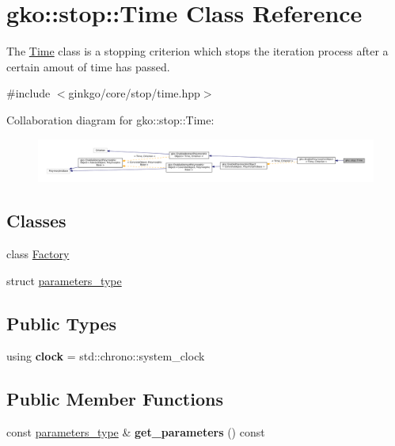 \hypertarget{classgko_1_1stop_1_1Time}{}\section{gko\+:\+:stop\+:\+:Time Class Reference}
\label{classgko_1_1stop_1_1Time}


The \hyperlink{classgko_1_1stop_1_1Time}{Time} class is a stopping criterion which stops the iteration process after a certain amout of time has passed.  




{\ttfamily \#include $<$ginkgo/core/stop/time.\+hpp$>$}



Collaboration diagram for gko\+:\+:stop\+:\+:Time\+:
\nopagebreak
\begin{figure}[H]
\begin{center}
\leavevmode
\includegraphics[width=350pt]{classgko_1_1stop_1_1Time__coll__graph}
\end{center}
\end{figure}
\subsection*{Classes}
\begin{DoxyCompactItemize}
\item 
class \hyperlink{classgko_1_1stop_1_1Time_1_1Factory}{Factory}
\item 
struct \hyperlink{structgko_1_1stop_1_1Time_1_1parameters__type}{parameters\+\_\+type}
\end{DoxyCompactItemize}
\subsection*{Public Types}
\begin{DoxyCompactItemize}
\item 
\mbox{\label{classgko_1_1stop_1_1Time_a0996672f7de5aff00ada313784e21331}} 
using {\bfseries clock} = std\+::chrono\+::system\+\_\+clock
\end{DoxyCompactItemize}
\subsection*{Public Member Functions}
\begin{DoxyCompactItemize}
\item 
\mbox{\label{classgko_1_1stop_1_1Time_a9de28a990182ba108e2f6e1e1dfdbd59}} 
const \hyperlink{structgko_1_1stop_1_1Time_1_1parameters__type}{parameters\+\_\+type} \& {\bfseries get\+\_\+parameters} () const
\end{DoxyCompactItemize}
